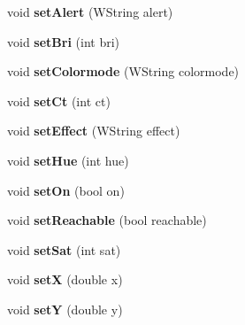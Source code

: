 \begin{DoxyCompactItemize}
\item 
void {\bfseries set\+Alert} (W\+String alert)\hypertarget{classGroup_afd0b4271a8c296af56ef5d3ff9e80fc9}{}\label{classGroup_afd0b4271a8c296af56ef5d3ff9e80fc9}

\item 
void {\bfseries set\+Bri} (int bri)\hypertarget{classGroup_a57633cb505ad98d535a0b95046cfa981}{}\label{classGroup_a57633cb505ad98d535a0b95046cfa981}

\item 
void {\bfseries set\+Colormode} (W\+String colormode)\hypertarget{classGroup_af2162664d3105d1bfa2a8ec4ff4ea03e}{}\label{classGroup_af2162664d3105d1bfa2a8ec4ff4ea03e}

\item 
void {\bfseries set\+Ct} (int ct)\hypertarget{classGroup_a976125ede586d1add50a81c702d427fd}{}\label{classGroup_a976125ede586d1add50a81c702d427fd}

\item 
void {\bfseries set\+Effect} (W\+String effect)\hypertarget{classGroup_a8022c5f90e7dd47ab1a35f645e93fbf3}{}\label{classGroup_a8022c5f90e7dd47ab1a35f645e93fbf3}

\item 
void {\bfseries set\+Hue} (int hue)\hypertarget{classGroup_a76f7ab63ec6c9df9d05d6c4553320c61}{}\label{classGroup_a76f7ab63ec6c9df9d05d6c4553320c61}

\item 
void {\bfseries set\+On} (bool on)\hypertarget{classGroup_a67bc57e13e2a45b5a20b309fb81e41a2}{}\label{classGroup_a67bc57e13e2a45b5a20b309fb81e41a2}

\item 
void {\bfseries set\+Reachable} (bool reachable)\hypertarget{classGroup_aea6be609d04ab4c57791d3633f903c1d}{}\label{classGroup_aea6be609d04ab4c57791d3633f903c1d}

\item 
void {\bfseries set\+Sat} (int sat)\hypertarget{classGroup_ab10b43f199a15ffb3ba1c47ec83e8150}{}\label{classGroup_ab10b43f199a15ffb3ba1c47ec83e8150}

\item 
void {\bfseries setX} (double x)\hypertarget{classGroup_a637524f920301f7dce2966443d0e5ad4}{}\label{classGroup_a637524f920301f7dce2966443d0e5ad4}

\item 
void {\bfseries setY} (double y)\hypertarget{classGroup_a298e441bf6bf212d04f54a46f0fab171}{}\label{classGroup_a298e441bf6bf212d04f54a46f0fab171}


\end{DoxyCompactItemize}
